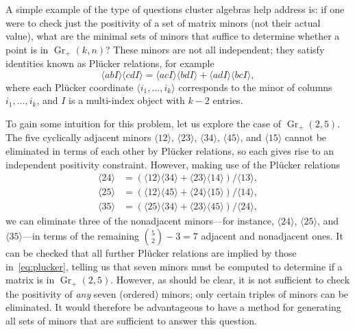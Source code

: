 \documentclass[12pt]{article}
\DeclareMathOperator{\Gr}{Gr}
\def\ket#1{\langle #1 \rangle}
\begin{document}
A simple example of the type of questions cluster algebras help address is: if one were to check just the positivity of a set of matrix minors (not their actual value), what are the minimal sets of minors that suffice to determine whether a point is in $\Gr_+(k,n)$? These minors are not all independent; they satisfy identities known as Pl\"ucker relations, for example
\begin{equation}
  \label{eq:plucker-rel}
  \ket{abI} \ket{cdI} = \ket{acI} \ket{bdI} + \ket{adI}\ket{bcI},
\end{equation}
where each Pl\"ucker coordinate $\ket{i_1,\ldots,i_k}$ corresponds to the minor of columns $i_1, \ldots,i_k$, and $I$ is a multi-index object with $k-2$ entries.

To gain some intuition for this problem, let us explore the case of $\Gr_+(2,5)$. The five cyclically adjacent minors $\ket{12}$, $\ket{23}$, $\ket{34}$, $\ket{45}$, and $\ket{15}$ cannot be eliminated in terms of each other by Pl\"ucker relations, so each gives rise to an independent positivity constraint. However, making use of the Pl\"ucker relations 
\begin{equation} \label{eq:plucker}
\begin{split}
	\ket{24} &= (\ket{12}\ket{34} + \ket{23}\ket{14})/\ket{13},\\
	\ket{25} &= (\ket{12}\ket{45} + \ket{24}\ket{15})/\ket{14},\\
	\ket{35} &= (\ket{25}\ket{34} + \ket{23}\ket{45})/\ket{24},
\end{split}	 	
\end{equation} 
we can eliminate three of the nonadjacent minors---for instance, $\ket{24}$, $\ket{25}$, and $\ket{35}$---in terms of the remaining ${{5}\choose{2}} - 3 = 7$ adjacent and nonadjacent ones. It can be checked that all further Pl\"ucker relations are implied by those in~\eqref{eq:plucker}, telling us that seven minors must be computed to determine if a matrix is in $\Gr_+(2,5)$. However, as should be clear, it is not sufficient to check the positivity of {\it any} seven (ordered) minors; only certain triples of minors can be eliminated. It would therefore be advantageous to have a method for generating all sets of minors that are sufficient to answer this question.
\end{document}
